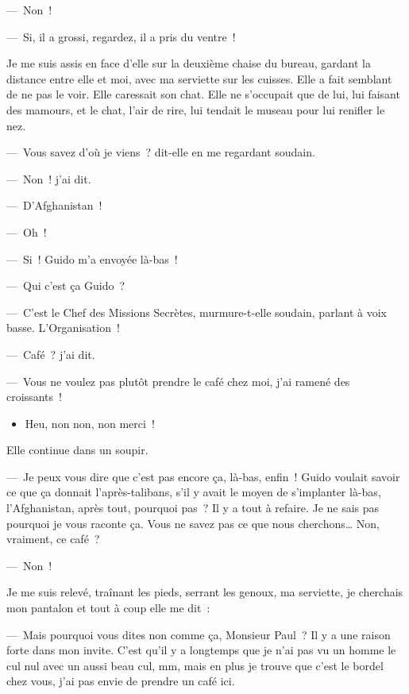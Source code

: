 \documentclass[twoside]{book} %
\begin{document}
— Non !\par
— Si, il a grossi, regardez, il a pris du ventre !\par
Je me suis assis en face d’elle sur la deuxième chaise du bureau, gardant la distance entre elle et moi, avec ma serviette sur les cuisses. Elle a fait semblant de ne pas le voir. Elle caressait son chat. Elle ne s’occupait que de lui, lui faisant des mamours, et le chat, l’air de rire, lui tendait le museau pour lui renifler le nez.\par
— Vous savez d’où je viens ? dit-elle en me regardant soudain.\par
— Non ! j’ai dit.\par
— D’Afghanistan !\par
— Oh !\par
— Si ! Guido m’a envoyée là-bas !\par
— Qui c’est ça Guido ?\par
— C’est le Chef des Missions Secrètes, murmure-t-elle soudain, parlant à voix basse. L’Organisation !\par
— Café ? j’ai dit.\par
— Vous ne voulez pas plutôt prendre le café chez moi, j’ai ramené des croissants !\par

\begin{itemize}[itemsep=0pt,topsep=0pt,partopsep=0pt,parskip=0pt]
\item Heu, non non, non merci !
\end{itemize}

\noindent Elle continue dans un soupir.\par
— Je peux vous dire que c’est pas encore ça, là-bas, enfin ! Guido voulait savoir ce que ça donnait l’après-talibans, s’il y avait le moyen de s’implanter là-bas, l’Afghanistan, après tout, pourquoi pas ? Il y a tout à refaire. Je ne sais pas pourquoi je vous raconte ça. Vous ne savez pas ce que nous cherchons… Non, vraiment, ce café ?\par
— Non !\par
Je me suis relevé, traînant les pieds, serrant les genoux, ma serviette, je cherchais mon pantalon et tout à coup elle me dit :\par
— Mais pourquoi vous dites non comme ça, Monsieur Paul ? Il y a une raison forte dans mon invite. C’est qu’il y a longtemps que je n’ai pas vu un homme le cul nul avec un aussi beau cul, mm, mais en plus je trouve que c’est le bordel chez vous, j’ai pas envie de prendre un café ici.
\end{document}
